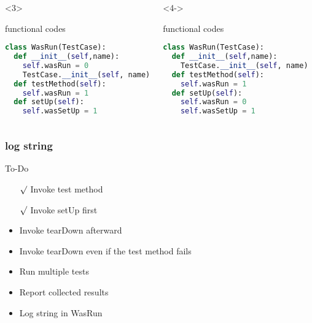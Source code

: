 \documentclass[lualatex]{beamer}
\begin{document}
\begin{frame}[fragile,t]
\begin{columns}[t]
        \begin{onlyenv}<3>
            \begin{block}{functional codes}
                \begin{lstlisting}[language=Python,columns=fullflexible]
class WasRun(TestCase):
  def __init__(self,name):
    self.wasRun = 0
    TestCase.__init__(self, name)
  def testMethod(self):
    self.wasRun = 1
  def setUp(self):
    self.wasSetUp = 1
                \end{lstlisting}
            \end{block}
        \end{onlyenv}

        \begin{onlyenv}<4->
            \begin{block}{functional codes}
                \begin{lstlisting}[language=Python,columns=fullflexible]
class WasRun(TestCase):
  def __init__(self,name):
    TestCase.__init__(self, name)
  def testMethod(self):
    self.wasRun = 1
  def setUp(self):
    self.wasRun = 0
    self.wasSetUp = 1
                \end{lstlisting}
            \end{block}
        \end{onlyenv}

    \end{columns}
\end{frame}

\begin{frame}
    \frametitle{log string}

    \begin{block}{To-Do}
        \begin{itemize}
            \item[$\surd$] Invoke test method
            \item[$\surd$] Invoke setUp first 
            \item Invoke tearDown afterward 
            \item Invoke tearDown even if the test method fails 
            \item Run multiple tests 
            \item Report collected results 
            \item Log string in WasRun 
        \end{itemize}
    \end{block}
\end{frame}
\end{document}
